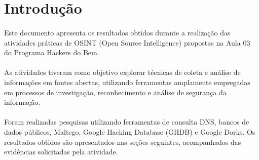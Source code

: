 \section{Introdução}

\paragraph{}
Este documento apresenta os resultados obtidos durante a realização das
atividades práticas de OSINT (Open Source Intelligence) propostas na Aula 03
do Programa Hackers do Bem.

\paragraph{}
As atividades tiveram como objetivo explorar técnicas de coleta e análise de
informações em fontes abertas, utilizando ferramentas amplamente empregadas em
processos de investigação, reconhecimento e análise de segurança da
informação.

\paragraph{}
Foram realizadas pesquisas utilizando ferramentas de consulta DNS, bancos de
dados públicos, Maltego, Google Hacking Database (GHDB) e Google Dorks. Os
resultados obtidos são apresentados nas seções seguintes, acompanhados das
evidências solicitadas pela atividade.
